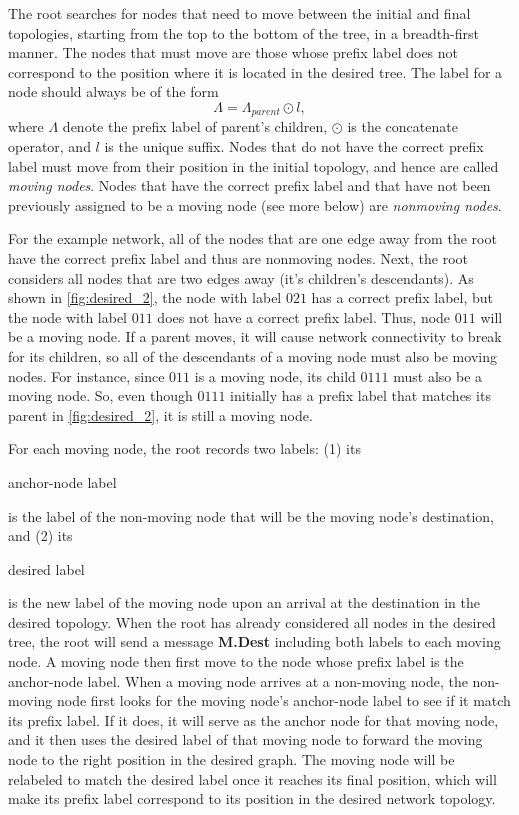 \documentclass[10pt,conference]{IEEEtran}
\begin{document}
The root searches for nodes that need to move between the initial and
final topologies, starting from the top to the bottom of the tree, in
a breadth-first manner.  The nodes that must move are those whose
prefix label does not correspond to the position where it is located
in the desired tree.  The label for a node should always be of the
form
\begin{equation}
\label{eq:prefix}
 \Lambda = \Lambda_{parent}\odot l,
\end{equation}
where $\Lambda$ denote the prefix label of parent's children, $\odot$
is the concatenate operator, and $l$ is the unique suffix.  Nodes that
do not have the correct prefix label must move from their position in
the initial topology, and hence are called {\it moving nodes}.  Nodes
that have the correct prefix label and that have not been previously
assigned to be a moving node (see more below) are {\it nonmoving nodes}.

For the example network, all of the nodes that are one edge away
from the root have the correct prefix label and thus are nonmoving
nodes. Next, the root considers all nodes that are two edges away
(it's children's descendants).  As shown in \autoref{fig:desired_2},
the node with label $021$ has a correct prefix label, but the node
with label $011$ does not have a correct prefix label.  Thus, node
$011$ will be a moving node.  If a parent moves, it will cause
network connectivity to break for its children, so all of the
descendants of a moving node must also be moving nodes.  For instance,
since $011$ is a moving node, its child $0111$ must also be a moving node.
So, even though $0111$ initially has a prefix label that matches its
parent in \autoref{fig:desired_2}, it is still a moving node.

For each moving node, the root records two labels: (1)
its \begin{it}anchor-node label \end{it} is the label of the
non-moving node that will be the moving node's destination, and (2)
its \begin{it} desired label\end{it} is the new label of the moving
node upon an arrival at the destination in the desired topology.  When
the root has already considered all nodes in the desired tree, the
root will send a message {\bf M.Dest} including both labels to each
moving node. A moving node then first move to the node whose prefix
label is the anchor-node label.  When a moving node arrives at a
non-moving node, the non-moving node first looks for the moving node's
anchor-node label to see if it match its prefix label. If it does, it
will serve as the anchor node for that moving node, and it then uses
the desired label of that moving node to forward the moving node to
the right position in the desired graph.  The moving node will be
relabeled to match the desired label once it reaches its final
position, which will make its prefix label correspond to
its position in the desired network topology.
\end{document}
